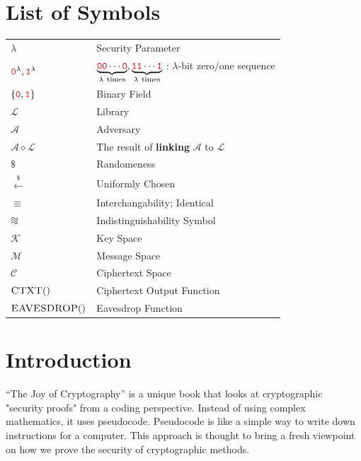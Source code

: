 \documentclass[12pt,openany]{book}
\theoremstyle{definition}
\newcommand{\keyspace}{\mathcal{K}}
\newcommand{\messagespace}{\mathcal{M}}
\newcommand{\ciphertextspace}{\mathcal{C}}
\newcommand{\library}{\mathcal{L}}
\newcommand{\zero}{\textcolor{red}{\texttt{0}}}
\newcommand{\one}{\textcolor{red}{\texttt{1}}}
\newcommand{\adversary}{\mathcal{A}}
\newcommand{\linking}{\diamond}
\newcommand{\randomness}{\$}
\newcommand{\uniform}{\xleftarrow{\randomness}}
\newcommand{\binaryfield}{\set{\zero,\one}}
\newcommand*{\indist}{%
	\mathrel{\vcenter{\offinterlineskip
			\hbox{$\sim$}\vskip-.35ex\hbox{$\sim$}\vskip-.35ex\hbox{$\sim$}}}}
\begin{document}
	\newpage
	\tableofcontents
	
	\mainmatter
	
	\chapter*{List of Symbols}
	
	\begin{tabular}{ll}
		\( \lambda \) & Security Parameter \\
		\( \zero^\lambda, \one^\lambda\) & \(\underbrace{\zero\zero\cdots\zero}_{\lambda\ \text{times}}, \underbrace{\one\one\cdots\one}_{\lambda\ \text{times}}\) : \(\lambda\)-bit zero/one sequence \\
		\( \binaryfield \) & Binary Field \\
		\( \library \) & Library \\
		\( \adversary \) & Adversary \\		
		\( \adversary\linking\library \) & The result of \textbf{linking} $\adversary$ to  $\library$ \\
		\( \randomness \) & Randomeness \\
		\( \uniform \) & Uniformly Chosen \\
		\( \equiv \) & Interchangability; Identical\\
		\( \indist \) & Indistinguishability Symbol\\
		\( \keyspace \) & Key Space\\
		\( \messagespace \) & Message Space\\
		\( \ciphertextspace \) & Ciphertext Space\\
		\( \textsc{CTXT}() \) & Ciphertext Output Function\\
		\( \textsc{EAVESDROP}() \) & Eavesdrop Function\\
	\end{tabular}
	
	\chapter*{Introduction}
	
	``The Joy of Cryptography'' is a unique book that looks at cryptographic "security proofs" from a coding perspective. Instead of using complex mathematics, it uses pseudocode. Pseudocode is like a simple way to write down instructions for a computer. This approach is thought to bring a fresh viewpoint on how we prove the security of cryptographic methods.
	
\end{document}
